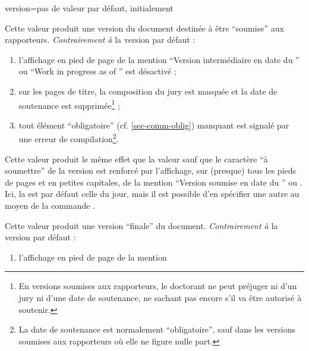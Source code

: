 {\begin{docKey}{version}{=\textbar{}\textbar{}\textbar{}\textbar{}\textbar{}}{pas
      de valeur par défaut, initialement }
\begin{description}
      Cette valeur produit une version du document
      destinée à être \enquote{soumise} aux rapporteurs. \emph{Contrairement à}
      la version par défaut :
      \begin{enumerate}
      \item l'affichage en pied de page de la mention
        \enquote{Version intermédiaire en date du } ou
        \foreignquote{english}{Work in progress as of } est
        désactivé ;
      \item {}%
        sur les pages de titre, la composition du jury est masquée et la date de
        soutenance est supprimée\footnote{En versions soumises aux rapporteurs,
          le doctorant ne peut préjuger ni d'un jury ni d'une date de
          soutenance, ne sachant pas encore s'il va être autorisé à soutenir.} ;
      \item tout élément \enquote{obligatoire} (cf. \vref{sec-comm-oblig})
        manquant est signalé par une erreur de compilation\footnote{La date de
          soutenance est normalement \enquote{obligatoire}, sauf dans les
          versions soumises aux rapporteurs où elle ne figure nulle part.}.
      \end{enumerate}
    \item[\docValue{submitted*}.] %
      Cette valeur produit le même effet que la valeur  sauf
      que le caractère \enquote{à soumettre} de la version est renforcé par
      l'affichage, sur (presque) tous les pieds de pages et
      en petites capitales, de la mention \enquote{Version soumise en date du
        } ou . Ici, la
       est par défaut celle du jour, mais il est possible d'en
      spécifier une autre au moyen de la commande .
    \item[\docValue{final}.]
      Cette valeur produit une version \enquote{finale}
      du document. \emph{Contrairement à} la version par défaut :
      \begin{enumerate}
      \item l'affichage en pied de page de la mention

\end{enumerate}
\end{description}
\end{docKey}}
